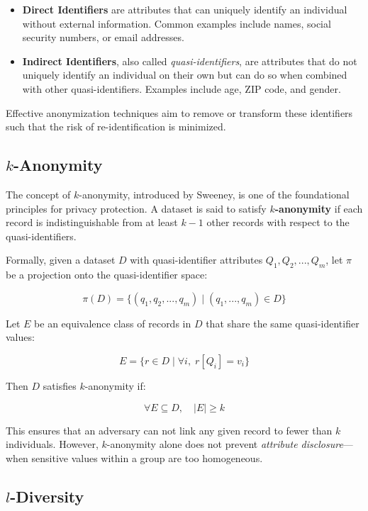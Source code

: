 \documentclass{article}
\begin{document}
\begin{itemize}
\item \textbf{Direct Identifiers} are attributes that can uniquely identify an individual without external information. Common examples include names, social security numbers, or email addresses.

\item \textbf{Indirect Identifiers}, also called \textit{quasi-identifiers}, are attributes that do not uniquely identify an individual on their own but can do so when combined with other quasi-identifiers. Examples include age, ZIP code, and gender.
\end{itemize}

Effective anonymization techniques aim to remove or transform these identifiers such that the risk of re-identification is minimized.

\subsection{$k$-Anonymity}

The concept of $k$-anonymity, introduced by Sweeney, is one of the foundational principles for privacy protection. A dataset is said to satisfy \textbf{$k$-anonymity} if each record is indistinguishable from at least $k-1$ other records with respect to the quasi-identifiers.

Formally, given a dataset $D$ with quasi-identifier attributes $Q_1, Q_2, ..., Q_m$, let $\pi$ be a projection onto the quasi-identifier space:

$$
\pi(D) = \{ (q_1, q_2, ..., q_m) \mid (q_1, ..., q_m) \in D \}
$$

Let $E$ be an equivalence class of records in $D$ that share the same quasi-identifier values:

$$
E = \{ r \in D \mid \forall i, \; r[Q_i] = v_i \}
$$

Then $D$ satisfies $k$-anonymity if:

$$
\forall E \subseteq D, \quad |E| \geq k
$$

This ensures that an adversary can not link any given record to fewer than $k$ individuals. However, $k$-anonymity alone does not prevent \textit{attribute disclosure}—when sensitive values within a group are too homogeneous.

\subsection{$l$-Diversity }
\end{document}
